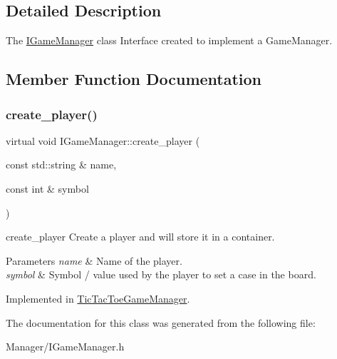 \subsection{Detailed Description}
The \hyperlink{class_i_game_manager}{I\+Game\+Manager} class Interface created to implement a Game\+Manager. 

\subsection{Member Function Documentation}
\mbox{\label{class_i_game_manager_a197ed85a1deadeb414b3030e11d0bf1e}} 
\subsubsection{\texorpdfstring{create\+\_\+player()}{create\_player()}}
{\footnotesize\ttfamily virtual void I\+Game\+Manager\+::create\+\_\+player (\begin{DoxyParamCaption}\item[{const std\+::string \&}]{name,  }\item[{const int \&}]{symbol }\end{DoxyParamCaption})\hspace{0.3cm}{\ttfamily [pure virtual]}}



create\+\_\+player Create a player and will store it in a container. 


\begin{DoxyParams}{Parameters}
{\em name} & Name of the player. \\
\hline
{\em symbol} & Symbol / value used by the player to set a case in the board. \\
\hline
\end{DoxyParams}


Implemented in \hyperlink{class_tic_tac_toe_game_manager_a2d2b1cf7c29f760811f3ecc983dd2c5f}{Tic\+Tac\+Toe\+Game\+Manager}.



The documentation for this class was generated from the following file\+:\begin{DoxyCompactItemize}
\item 
Manager/I\+Game\+Manager.\+h\end{DoxyCompactItemize}
